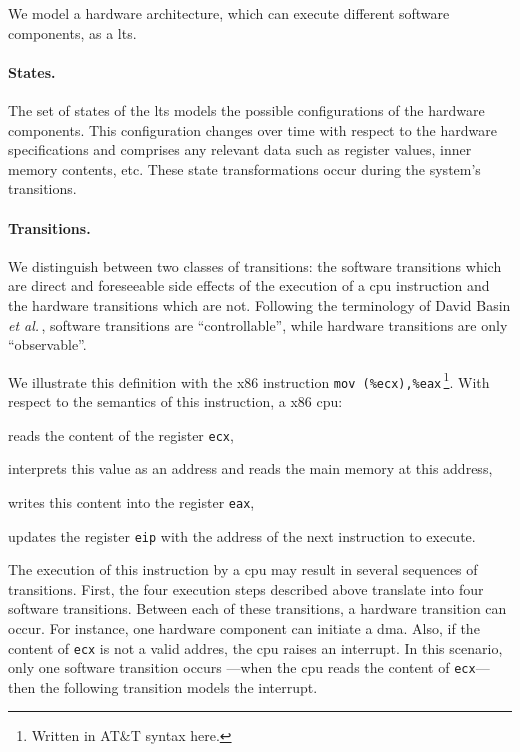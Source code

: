 We model a hardware architecture, which can execute different software
components, as a \ac{lts}.

\paragraph{States.}
%
The set of states of the \ac{lts} models the possible configurations of the
hardware components.
%
This configuration changes over time with respect to the hardware specifications
and comprises any relevant data such as register values, inner memory contents,
etc.
%
These state transformations occur during the system's transitions.

\paragraph{Transitions.}
%
We distinguish between two classes of transitions: the software transitions
which are direct and foreseeable side effects of the execution of a \ac{cpu}
instruction and the hardware transitions which are not.
%
Following the terminology of David Basin \emph{et
  al.}\,\cite{basin2013enforceable}, software transitions are ``controllable'',
while hardware transitions are only ``observable''.

We illustrate this definition with the x86 instruction \texttt{mov
  (\%ecx),\%eax}\,\footnote{Written in AT\&T syntax here.}.
%
With respect to the semantics of this instruction, a x86 \ac{cpu}:
%
\begin{inparaenum}[(1)]
\item reads the content of the register \texttt{ecx},
%
\item interprets this value as an address and reads the main memory at this
  address,
%
\item writes this content into the register \texttt{eax},
%
\item updates the register \texttt{eip} with the address of the next instruction
  to execute.
\end{inparaenum}
%
The execution of this instruction by a \ac{cpu} may result in several sequences
of transitions.
%
First, the four execution steps described above translate into four software
transitions.
%
Between each of these transitions, a hardware transition can occur.
%
For instance, one hardware component can initiate a \ac{dma}.
%
Also, if the content of \texttt{ecx} is not a valid addres, the \ac{cpu} raises
an interrupt.
%
In this scenario, only one software transition occurs ---when the \ac{cpu} reads
the content of \texttt{ecx}--- then the following transition models the
interrupt.

